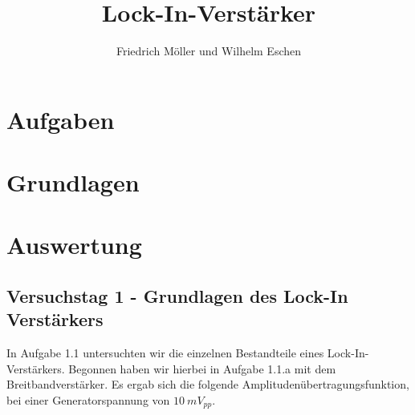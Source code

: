 \documentclass{scrartcl}						%
\title{Lock-In-Verstärker}
\author{Friedrich Möller und Wilhelm Eschen}
\begin{document}
	\maketitle
	\tableofcontents
	\clearpage
			

\section{Aufgaben}

	
\clearpage

\section{Grundlagen}
		
		
	\clearpage
				 
\section{Auswertung}		
		\subsection{Versuchstag 1 - Grundlagen des Lock-In Verstärkers}
			In Aufgabe 1.1 untersuchten wir die einzelnen Bestandteile eines Lock-In-Verstärkers. Begonnen haben wir hierbei in Aufgabe 1.1.a mit dem Breitbandverstärker. Es ergab sich die folgende Amplitudenübertragungsfunktion, bei einer Generatorspannung von $ 10 \ mV_{pp} $.
			
\end{document}
